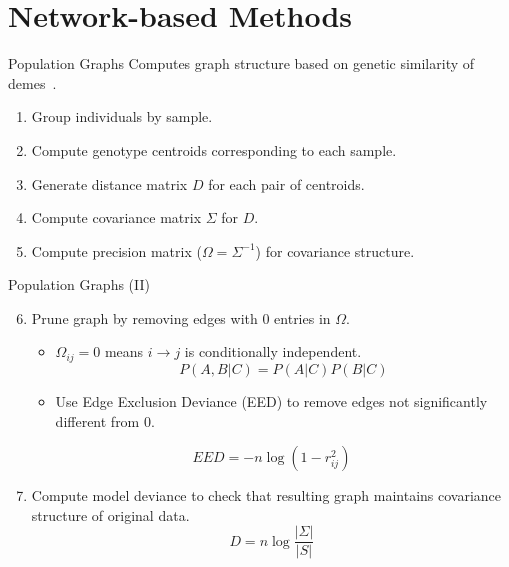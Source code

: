\documentclass{beamer}
\begin{document}
\section{Network-based Methods}

\begin{frame}{Population Graphs}
  Computes graph structure based on genetic similarity of
  demes~\cite{dyer_population_2004}.
  \begin{enumerate}
    \item Group individuals by sample.
    \item Compute genotype centroids corresponding to each sample.
    \item Generate distance matrix $D$ for each pair of centroids.
    \item Compute covariance matrix $\Sigma$ for $D$.
    \item Compute precision matrix ($\Omega = \Sigma^{-1}$) for covariance
      structure.
  \end{enumerate}
\end{frame}

\begin{frame}{Population Graphs (II)}
  \begin{enumerate}
    \setcounter{enumi}{5}
    \item Prune graph by removing edges with 0 entries in $\Omega$. 
      \begin{itemize}
        \item $\Omega_{ij} = 0$ means $i\rightarrow j$ is conditionally independent.
        \begin{equation*}
          P(A,B|C) = P(A|C) P(B|C)
        \end{equation*}
        \item Use Edge Exclusion Deviance (EED) to remove edges not
          significantly different from 0.
      \end{itemize}
        \begin{equation*}
          EED = -{n} \log{(1-r_{ij}^2)}
        \end{equation*}
    \item Compute model deviance to check that resulting graph maintains
      covariance structure of original data.
    \begin{equation*}
      D = {n} \log\frac{|\Sigma|}{|S|}
    \end{equation*}
  \end{enumerate}
\end{frame}
\end{document}
